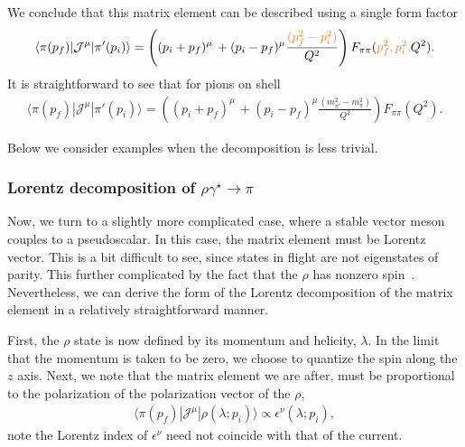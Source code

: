 We conclude that this matrix element can be described using a single form factor
	\begin{align}
	\langle\pi(p_f)|{\mathcal{J}}^{\mu}|\pi'(p_i)\rangle=
	\left( (p_i+p_f)^\mu \, +(p_i-p_f)^\mu\frac{{\color{orange}(p_f^2-p_i^2)}}{Q^2}\right)F_{\pi\pi}({\color{orange} p_f^2,p_i^2,}Q^2).
	\label{eq:pi_to_pi_FF}
	\end{align}
	{\ab
	It is straightforward to see that for pions on shell}
	\begin{align}
	\langle\pi(p_f)|{\mathcal{J}}^{\mu}|\pi'(p_i)\rangle=
	\left( (p_i+p_f)^\mu \, +(p_i-p_f)^\mu\frac{(m_{\pi'}^2-m_\pi^2)}{Q^2}\right)F_{\pi\pi}(Q^2).
	\label{eq:pi_to_pi_FF}
	\end{align}


Below we consider examples when the decomposition is less trivial.  

{}


\subsubsection{Lorentz decomposition of $\rho\gamma^\star\to\pi$}

Now, we turn to a slightly more complicated case, where a stable vector meson couples to a pseudoscalar.  In this case, the matrix element must be Lorentz vector. This is a bit difficult to see, since states in flight are not eigenstates of parity. This further complicated by the fact that the $\rho$ has nonzero spin~\cite{Thomas:2011rh}. Nevertheless, we can derive the form of the Lorentz decomposition of the matrix element in a relatively straightforward manner.

First, the $\rho$ state is now defined by its momentum and helicity, $\lambda$. In the limit that the momentum is taken to be zero, we choose to quantize the spin along the $z$ axis.  Next, we note that the matrix element we are after, must be proportional to the polarization of the polarization vector of the $\rho$,
\begin{align}
\langle \pi(p_f)|\mathcal{J}^\mu|\rho(\lambda; p_i)\rangle\propto \epsilon^\nu(\lambda; p_i),
\end{align}
note the Lorentz index of $\epsilon^\nu$ need not coincide with that of the current. 

